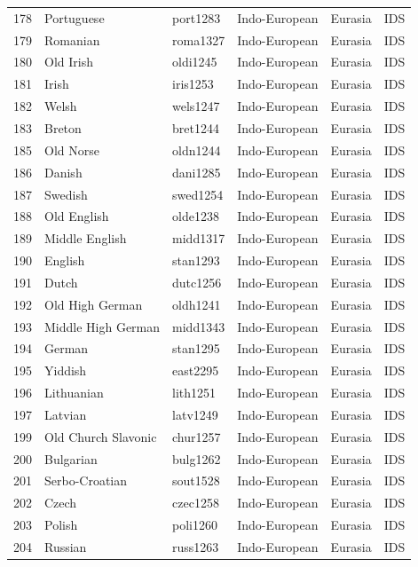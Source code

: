 \begin{table}[ht]
\begin{tabular}{rlllll}
  178 & Portuguese & port1283 & Indo-European & Eurasia & IDS \\ 
  179 & Romanian & roma1327 & Indo-European & Eurasia & IDS \\ 
  180 & Old Irish & oldi1245 & Indo-European & Eurasia & IDS \\ 
  181 & Irish & iris1253 & Indo-European & Eurasia & IDS \\ 
  182 & Welsh & wels1247 & Indo-European & Eurasia & IDS \\ 
  183 & Breton & bret1244 & Indo-European & Eurasia & IDS \\ 
  185 & Old Norse & oldn1244 & Indo-European & Eurasia & IDS \\ 
  186 & Danish & dani1285 & Indo-European & Eurasia & IDS \\ 
  187 & Swedish & swed1254 & Indo-European & Eurasia & IDS \\ 
  188 & Old English & olde1238 & Indo-European & Eurasia & IDS \\ 
  189 & Middle English & midd1317 & Indo-European & Eurasia & IDS \\ 
  190 & English & stan1293 & Indo-European & Eurasia & IDS \\ 
  191 & Dutch & dutc1256 & Indo-European & Eurasia & IDS \\ 
  192 & Old High German & oldh1241 & Indo-European & Eurasia & IDS \\ 
  193 & Middle High German & midd1343 & Indo-European & Eurasia & IDS \\ 
  194 & German & stan1295 & Indo-European & Eurasia & IDS \\ 
  195 & Yiddish & east2295 & Indo-European & Eurasia & IDS \\ 
  196 & Lithuanian & lith1251 & Indo-European & Eurasia & IDS \\ 
  197 & Latvian & latv1249 & Indo-European & Eurasia & IDS \\ 
  199 & Old Church Slavonic & chur1257 & Indo-European & Eurasia & IDS \\ 
  200 & Bulgarian & bulg1262 & Indo-European & Eurasia & IDS \\ 
  201 & Serbo-Croatian & sout1528 & Indo-European & Eurasia & IDS \\ 
  202 & Czech & czec1258 & Indo-European & Eurasia & IDS \\ 
  203 & Polish & poli1260 & Indo-European & Eurasia & IDS \\ 
  204 & Russian & russ1263 & Indo-European & Eurasia & IDS \\ 

\end{tabular}
\end{table}
